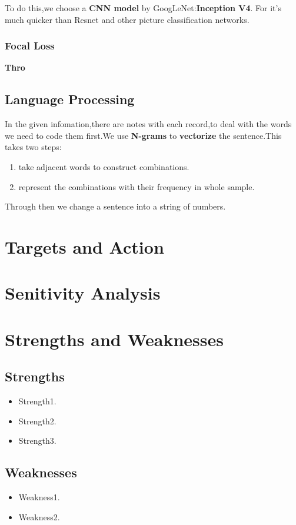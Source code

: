 \documentclass[12pt]{article}
\begin{document}
To do this,we choose a \textbf{CNN model} by GoogLeNet:\textbf{Inception V4}. For it's much quicker than Resnet and other picture classification networks.

\subsubsection{Focal Loss}
\textbf{Thro}


\subsection{Language Processing}
In the given infomation,there are notes with each record,to deal with the words we need to code them first.We use \textbf{N-grams} to \textbf{vectorize} the sentence.This takes two steps:
\begin{enumerate}
	\item take adjacent words to construct combinations.
	\item represent the combinations with their frequency in whole sample.
\end{enumerate}
Through then we change a sentence into a string of numbers.



\section{Targets and Action}
\section{Senitivity Analysis}\label{condition}
\section{ Strengths and Weaknesses}
\subsection{Strengths}
\begin{itemize}
	\item Strength1.
	\item Strength2.
	\item Strength3.
\end{itemize}
\subsection{Weaknesses}
\begin{itemize}
	\item Weakness1.
	\item Weakness2.
\end{itemize}
\end{document}

